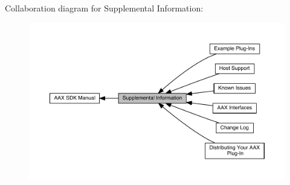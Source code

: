 Collaboration diagram for Supplemental Information\+:
\nopagebreak
\begin{figure}[H]
\begin{center}
\leavevmode
\includegraphics[width=350pt]{a00371}
\end{center}
\end{figure}
